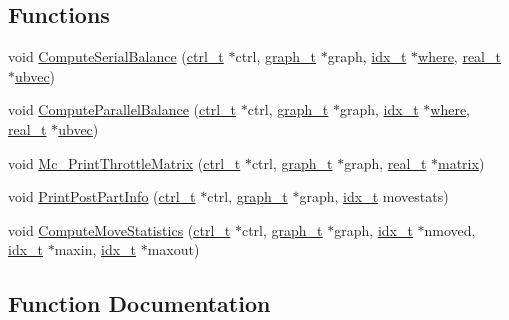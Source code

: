\subsection*{Functions}
\begin{DoxyCompactItemize}
\item 
void \hyperlink{a00969_a48a74c9a48910c6ac34c15a4d0ab41b7}{Compute\+Serial\+Balance} (\hyperlink{a00742}{ctrl\+\_\+t} $\ast$ctrl, \hyperlink{a00734}{graph\+\_\+t} $\ast$graph, \hyperlink{a00876_aaa5262be3e700770163401acb0150f52}{idx\+\_\+t} $\ast$\hyperlink{a00879_a7a355801f721e9d8d4ae03590a3a56b0}{where}, \hyperlink{a00876_a1924a4f6907cc3833213aba1f07fcbe9}{real\+\_\+t} $\ast$\hyperlink{a00879_af48bb348bc8440a61f90f137de83f203}{ubvec})
\item 
void \hyperlink{a00969_aab34140bbbccdd5b71308b7833812e4c}{Compute\+Parallel\+Balance} (\hyperlink{a00742}{ctrl\+\_\+t} $\ast$ctrl, \hyperlink{a00734}{graph\+\_\+t} $\ast$graph, \hyperlink{a00876_aaa5262be3e700770163401acb0150f52}{idx\+\_\+t} $\ast$\hyperlink{a00879_a7a355801f721e9d8d4ae03590a3a56b0}{where}, \hyperlink{a00876_a1924a4f6907cc3833213aba1f07fcbe9}{real\+\_\+t} $\ast$\hyperlink{a00879_af48bb348bc8440a61f90f137de83f203}{ubvec})
\item 
void \hyperlink{a00969_a48f286a4f71519dfc8262f34746495f9}{Mc\+\_\+\+Print\+Throttle\+Matrix} (\hyperlink{a00742}{ctrl\+\_\+t} $\ast$ctrl, \hyperlink{a00734}{graph\+\_\+t} $\ast$graph, \hyperlink{a00876_a1924a4f6907cc3833213aba1f07fcbe9}{real\+\_\+t} $\ast$\hyperlink{a01014_af07ff1035f34d77764ff516f110e6832}{matrix})
\item 
void \hyperlink{a00969_a6f0fa911c3fe611186b0233e2bb19555}{Print\+Post\+Part\+Info} (\hyperlink{a00742}{ctrl\+\_\+t} $\ast$ctrl, \hyperlink{a00734}{graph\+\_\+t} $\ast$graph, \hyperlink{a00876_aaa5262be3e700770163401acb0150f52}{idx\+\_\+t} movestats)
\item 
void \hyperlink{a00969_aa0a183e7221e2e7b4010355c77fa36c5}{Compute\+Move\+Statistics} (\hyperlink{a00742}{ctrl\+\_\+t} $\ast$ctrl, \hyperlink{a00734}{graph\+\_\+t} $\ast$graph, \hyperlink{a00876_aaa5262be3e700770163401acb0150f52}{idx\+\_\+t} $\ast$nmoved, \hyperlink{a00876_aaa5262be3e700770163401acb0150f52}{idx\+\_\+t} $\ast$maxin, \hyperlink{a00876_aaa5262be3e700770163401acb0150f52}{idx\+\_\+t} $\ast$maxout)
\end{DoxyCompactItemize}


\subsection{Function Documentation}
\mbox{\label{a00969_aa0a183e7221e2e7b4010355c77fa36c5}} 
